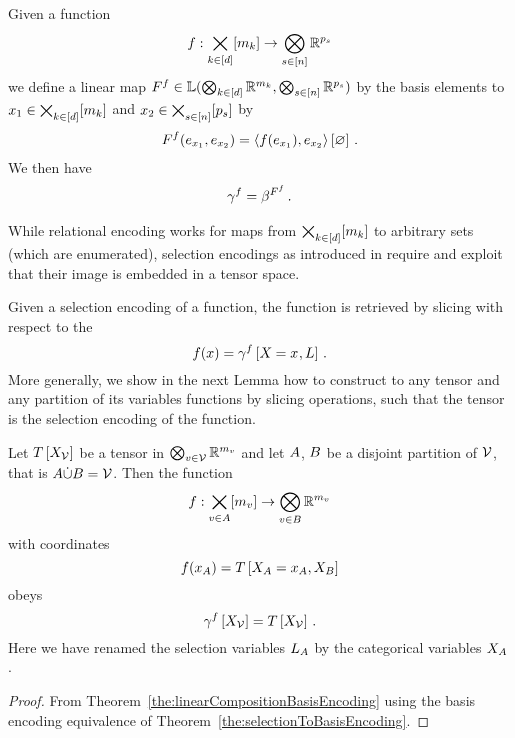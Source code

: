 \begin{theorem}
    \label{the:selectionToBasisEncoding}
    Given a function
    \[ f : \bigtimes_{k\in[d]}[m_{k}] \rightarrow \bigotimes_{s\in[n]}\mathbb{R}^{p_{s}} \]
    we define a linear map $F^{f}\in\mathbb{L}(\bigotimes_{k\in[d]} \mathbb{R}^{m_{k}},\bigotimes_{s\in[n]}\mathbb{R}^{p_{s}})$ by the basis elements to $x_{1} \in\bigtimes_{k\in[d]}[m_{k}]$ and $x_{2}\in\bigtimes_{s\in[n]}[p_{s}]$ by
    \begin{align*}
        F^{f}(e_{x_{1}},e_{x_{2}})
        = \left\langle f(e_{x_{1}}),e_{x_{2}}\right\rangle \left[ \varnothing \right] \, .
    \end{align*}
    We then have
    \begin{align*}
        \gamma^{f} = \beta^{F^{f}} \, .
    \end{align*}
\end{theorem}




While relational encoding works for maps from $\bigtimes_{k\in[d]}[m_{k}]$ to arbitrary sets (which are enumerated), selection encodings as introduced in  require and exploit that their image is embedded in a tensor space.

Given a selection encoding of a function, the function is retrieved by slicing with respect to the
\[ f(x) = \gamma^{f}\left[X_{}=x_{},L\right] \, . \]
More generally, we show in the next Lemma how to construct to any tensor and any partition of its variables functions by slicing operations, such that the tensor is the selection encoding of the function.

\begin{lemma}
    \label{lem:inverseSelectionEncoding} %
    Let $T\left[X_{\mathcal{V}}\right]$ be a tensor in $\bigotimes_{v\in\mathcal{V}}\mathbb{R}^{m_{v}}$ and let $A$, $B$ be a disjoint partition of $\mathcal{V}$, that is $A\dot{\cup}B=\mathcal{V}$.
    Then the function
    \[ f : \bigtimes_{v\in A}[m_{v}] \rightarrow \bigotimes_{v\in B} \mathbb{R}^{m_{v}}  \]
    with coordinates
    \[ f(x_{A}) = T\left[X_{A}=x_{A},X_{B}\right]  \]
    obeys
    \[ \gamma^{f}\left[X_{\mathcal{V}}\right] = T\left[X_{\mathcal{V}}\right] \, . \]
    Here we have renamed the selection variables $L_{A}$ by the categorical variables $X_{A}$.
\end{lemma}
\begin{proof}
    From Theorem~\ref{the:linearCompositionBasisEncoding} using the basis encoding equivalence of Theorem~\ref{the:selectionToBasisEncoding}.
\end{proof}


